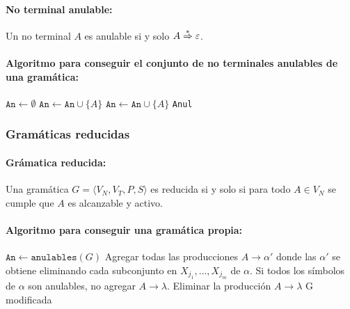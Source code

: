 \paragraph{No terminal anulable:} Un no terminal \(A\) es anulable si y solo  \(A\overset{*}{\Rightarrow} \varepsilon\).

\paragraph{Algoritmo para conseguir el conjunto de no terminales anulables de una gramática:}

\begin{algorithmic}
  \State \(\texttt{An}\gets\emptyset\)
  \If{\(\alpha = \lambda\)}
  \State\(\texttt{An}\leftarrow\texttt{An}\cup \{A\}\)
  \EndIf
  \EndFor
  \Repeat
  \State\(\texttt{An}\leftarrow\texttt{An}\cup \{A\}\)
  \EndIf
  \EndFor
  \State \Return \texttt{Anul}
  \EndFunction
\end{algorithmic}

\subsubsection{Gramáticas reducidas}
\paragraph{Grámatica reducida:} Una gramática \(G = \langle V_N, V_T, P, S\rangle\) es reducida si y solo si para todo \(A\in V_N\) se cumple que \(A\) es alcanzable y activo.
\paragraph{Algoritmo para conseguir una gramática propia:}

\begin{algorithmic}
  \State \(\texttt{An}\gets\texttt{anulables}(G)\)
  \State Agregar todas las producciones \(A\to\alpha'\) donde las \(\alpha'\) se obtiene eliminando cada subconjunto en \(X_{j_1}, \dots, X_{j_m}\) de \(\alpha\). Si todos los símbolos de \(\alpha\) son anulables, no agregar \(A\to \lambda\).
  \EndIf
  \If{\(\alpha = \lambda\)}
  \State Eliminar la producción \(A\to \lambda\)
  \EndIf
  \EndFor
  \State \Return G modificada
  \EndFunction
\end{algorithmic}

